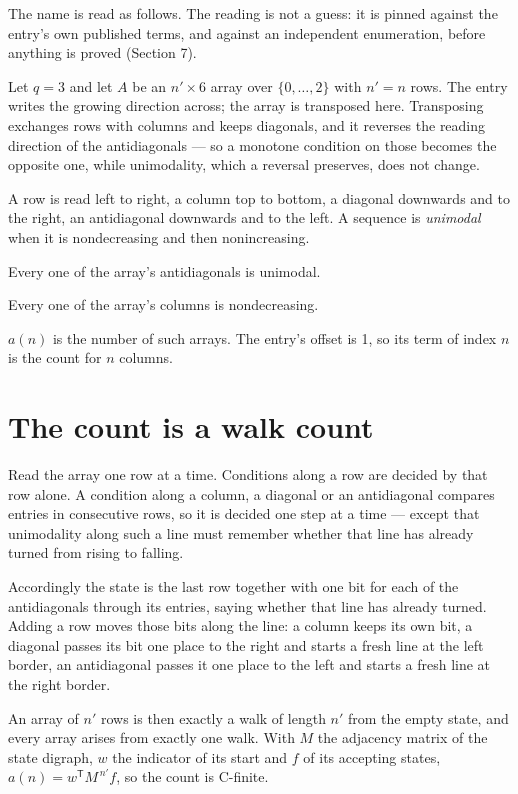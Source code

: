 \documentclass[11pt]{article}
\theoremstyle{definition}
\begin{document}
The name is read as follows. The reading is not a guess: it is pinned against the entry's own published terms, and against an independent enumeration, before anything is proved (Section 7).

Let $q = 3$ and let $A$ be an $n' \times 6$ array over $\{0,\dots,2\}$ with $n' = n$ rows. The entry writes the growing direction across; the array is transposed here. Transposing exchanges rows with columns and keeps diagonals, and it reverses the reading direction of the antidiagonals --- so a monotone condition on those becomes the opposite one, while unimodality, which a reversal preserves, does not change.

A row is read left to right, a column top to bottom, a diagonal downwards and to the right, an antidiagonal downwards and to the left. A sequence is {\itshape unimodal} when it is nondecreasing and then nonincreasing.

Every one of the array's antidiagonals is unimodal.

Every one of the array's columns is nondecreasing.

$a(n)$ is the number of such arrays. The entry's offset is 1, so its term of index $n$ is the count for $n$ columns.

\section{The count is a walk count}

Read the array one row at a time. Conditions along a row are decided by that row alone. A condition along a column, a diagonal or an antidiagonal compares entries in consecutive rows, so it is decided one step at a time --- except that unimodality along such a line must remember whether that line has already turned from rising to falling.

Accordingly the state is the last row together with one bit for each of the antidiagonals through its entries, saying whether that line has already turned. Adding a row moves those bits along the line: a column keeps its own bit, a diagonal passes its bit one place to the right and starts a fresh line at the left border, an antidiagonal passes it one place to the left and starts a fresh line at the right border.

An array of $n'$ rows is then exactly a walk of length $n'$ from the empty state, and every array arises from exactly one walk. With $M$ the adjacency matrix of the state digraph, $w$ the indicator of its start and $f$ of its accepting states, $a(n) = w^{\mathsf T}M^{\,n'}f$, so the count is C-finite.
\end{document}
